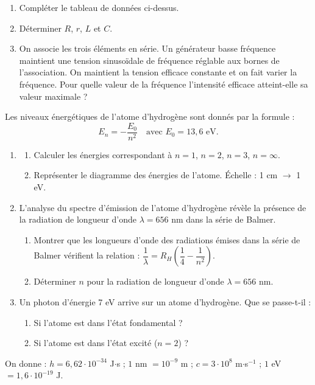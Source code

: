 \documentclass[11pt]{article}
\begin{document}
\begin{enumerate}
  \item Compléter le tableau de données ci-dessus.
  \item Déterminer $R$, $r$, $L$ et $C$.
  \item On associe les trois éléments en série. Un générateur basse fréquence maintient une tension sinusoïdale de fréquence réglable aux bornes de l'association. On maintient la tension efficace constante et on fait varier la fréquence. Pour quelle valeur de la fréquence l'intensité efficace atteint-elle sa valeur maximale ?
\end{enumerate}


Les niveaux énergétiques de l'atome d'hydrogène sont donnés par la formule :
\[ E_n = -\frac{E_0}{n^2} \quad \text{avec } E_0 = 13{,}6 \text{ eV.} \]

\begin{enumerate}
  \item \begin{enumerate}[label=\alph*.]
    \item Calculer les énergies correspondant à $n = 1$, $n = 2$, $n = 3$, $n = \infty$.
    \item Représenter le diagramme des énergies de l'atome. Échelle : 1 cm $\longrightarrow$ 1 eV.
  \end{enumerate}
  \item L'analyse du spectre d'émission de l'atome d'hydrogène révèle la présence de la radiation de longueur d'onde $\lambda = 656$ nm dans la série de Balmer.
  \begin{enumerate}[label=\alph*.]
    \item Montrer que les longueurs d'onde des radiations émises dans la série de Balmer vérifient la relation : $\dfrac{1}{\lambda} = R_H\left(\dfrac{1}{4} - \dfrac{1}{n^2}\right)$.
    \item Déterminer $n$ pour la radiation de longueur d'onde $\lambda = 656$ nm.
  \end{enumerate}
  \item Un photon d'énergie 7 eV arrive sur un atome d'hydrogène. Que se passe-t-il :
  \begin{enumerate}[label=\alph*.]
    \item Si l'atome est dans l'état fondamental ?
    \item Si l'atome est dans l'état excité ($n = 2$) ?
  \end{enumerate}
\end{enumerate}
\noindent On donne : $h = 6{,}62\cdot10^{-34}$ J$\cdot$s ; $1$ nm $= 10^{-9}$ m ; $c = 3\cdot10^8$ m$\cdot$s$^{-1}$ ; $1$ eV $= 1{,}6\cdot10^{-19}$ J.
\end{document}
